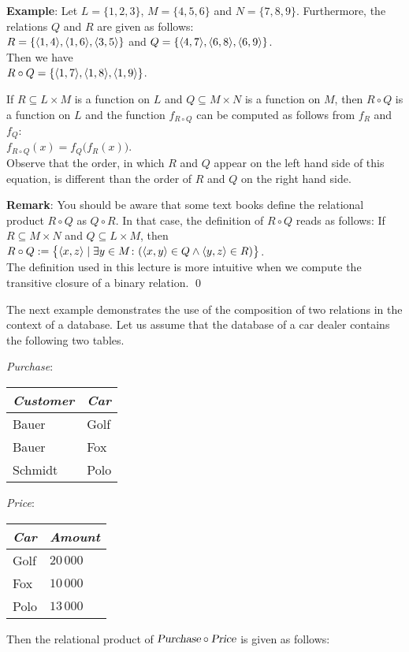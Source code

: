 \noindent
\textbf{Example}: 
Let $L = \{1,2,3\}$, $M = \{4,5,6\}$ and $N = \{7,8,9\}$.  Furthermore, the relations
$Q$ and $R$ are given as follows: \\[0.2cm]
\hspace*{1.3cm} $R = \{ \pair(1,4), \pair(1,6), \pair(3,5) \}$ \quad and \quad
                $Q = \{ \pair(4,7), \pair(6,8), \pair(6,9) \}$. \\[0.2cm]
Then we have \\[0.2cm]
\hspace*{1.3cm} $R \circ Q = \{ \pair(1,7), \pair(1,8), \pair(1,9) \}$.
\vspace{0.2cm}


\noindent
If $R \subseteq L \times M$ is a function on $L$ and  $Q \subseteq M \times N$ is a
function on $M$, then
$R \circ Q$ is a function on $L$ and the function $f_{R \circ Q}$ can be computed as
follows from $f_R$ and $f_Q$:
\\[0.2cm]
\hspace*{1.3cm}
$f_{R \circ Q}(x) = f_Q\bigl(f_R(x)\bigr)$.
\\[0.2cm]
Observe that the order, in which $R$ and $Q$ appear on the left hand side of this equation,
is different than the order of $R$ and $Q$ on the right hand side.


\noindent
\textbf{Remark}:  You should be aware that some text books define the relational product
$R \circ Q$ as $Q \circ R$.
In that case, the definition of $R \circ Q$ reads as follows:
If  $R \subseteq M \times N$ and $Q \subseteq L \times M$, then
\\[0.2cm]
\hspace*{1.3cm}
$R \circ Q := \bigl\{ \pair(x,z) \mid \exists y \in M \colon(\pair(x,y) \in Q \wedge
\pair(y,z) \in R) \bigr\}$.
\\[0.2cm]
The definition used in this lecture is more intuitive when we compute the transitive
closure of a binary relation.  \qed



\example
The next example demonstrates the use of the composition of two relations in the context
of a database.  Let us assume that the database of a car dealer contains the following two tables.
\begin{center}
\textsl{Purchase}:  \begin{tabular}[t]{|l|l|}
\hline
\textsl{Customer} & \textsl{Car} \\
\hline
\hline
  Bauer   & Golf \\
\hline
  Bauer   & Fox  \\
\hline
  Schmidt & Polo \\
\hline
  \end{tabular}
\qquad \textsl{Price}:
  \begin{tabular}[t]{|l|l|}
\hline
\textsl{Car} & \textsl{Amount} \\
\hline
\hline
  Golf    & $20\,000$ \\
\hline
  Fox     & $10\,000$ \\
\hline
  Polo    & $13\,000$ \\
\hline
  \end{tabular}
\end{center}
Then the  relational product of $\textsl{Purchase} \circ \textsl{Price}$ is given as follows:

